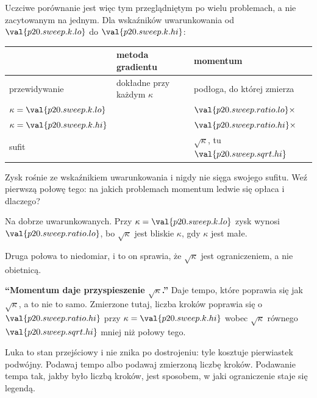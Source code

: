 \begin{fr}
Uczciwe porównanie jest więc tym przeglądniętym po wielu problemach, a nie
zacytowanym na jednym. Dla wskaźników uwarunkowania od $\val{p20.sweep.k.lo}$
do $\val{p20.sweep.k.hi}$:

\begin{center}
\begin{tabular}{lll}
\toprule
& metoda gradientu & momentum \\
\midrule
przewidywanie & dokładne przy każdym $\kappa$ & podłoga, do której zmierza \\
$\kappa = \val{p20.sweep.k.lo}$ & \dash{} & $\val{p20.sweep.ratio.lo}\times$ \\
$\kappa = \val{p20.sweep.k.hi}$ & \dash{} & $\val{p20.sweep.ratio.hi}\times$ \\
sufit & \dash{} & $\sqrt{\kappa}$, tu $\val{p20.sweep.sqrt.hi}$ \\
\bottomrule
\end{tabular}
\end{center}

Zysk rośnie ze wskaźnikiem uwarunkowania i nigdy nie sięga swojego sufitu.
Weź pierwszą połowę tego: na jakich problemach momentum ledwie się opłaca i
dlaczego?
\nextframe
\end{fr}

\begin{fr}
\begin{ansblock}
Na dobrze uwarunkowanych. Przy $\kappa = \val{p20.sweep.k.lo}$ zysk wynosi
$\val{p20.sweep.ratio.lo}$, bo $\sqrt{\kappa}$ jest bliskie $\kappa$, gdy
$\kappa$ jest małe.
\end{ansblock}

Druga połowa to niedomiar, i to on sprawia, że $\sqrt{\kappa}$ jest
ograniczeniem, a nie obietnicą.

\begin{trapbox}
\textbf{\enquote{Momentum daje przyspieszenie $\sqrt{\kappa}$.}} Daje tempo,
które poprawia się jak $\sqrt{\kappa}$, a to nie to samo. Zmierzone tutaj,
liczba kroków poprawia się o $\val{p20.sweep.ratio.hi}$ przy
$\kappa = \val{p20.sweep.k.hi}$ wobec $\sqrt{\kappa}$ równego
$\val{p20.sweep.sqrt.hi}$ \dash{} mniej niż połowy tego.

Luka to stan przejściowy i nie znika po dostrojeniu: tyle kosztuje pierwiastek
podwójny. Podawaj tempo albo podawaj zmierzoną liczbę kroków. Podawanie tempa
tak, jakby było liczbą kroków, jest sposobem, w jaki ograniczenie staje się
legendą.
\end{trapbox}
\end{fr}

